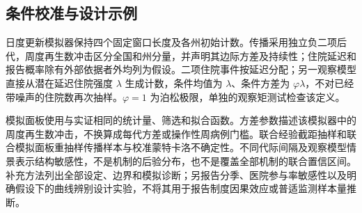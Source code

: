 \subsection{条件校准与设计示例}
\label{sec:meth-inversion}

日度更新模拟器保持四个固定窗口长度及各州初始计数。传播采用独立负二项后代，周度再生数冲击区分全国和州分量，并声明其边际方差及持续性；住院延迟和报告概率除有外部依据者外均列为假设。二项住院事件按延迟分配；另一观察模型直接从潜在延迟住院强度 $\lambda$ 生成计数，条件均值为 $\lambda$、条件方差为 $\varphi\lambda$，不对已经带噪声的住院数再次抽样。$\varphi=1$ 为泊松极限，单独的观察矩测试检查该定义。

模拟面板使用与实证相同的统计量、筛选和拟合函数。方差参数描述该模拟器中的周度再生数冲击，不换算成每代方差或操作性周病例门槛。联合经验截距抽样和联合模拟面板重抽样传播样本与校准蒙特卡洛不确定性。不同代际间隔及观察模型情景表示结构敏感性，不是机制的后验分布，也不是覆盖全部机制的联合置信区间。补充方法列出全部设定、边界和模拟诊断；另报告分季、医院参与率敏感性以及明确假设下的曲线辨别设计实验，不将其用于报告制度因果效应或普适监测样本量推断。
